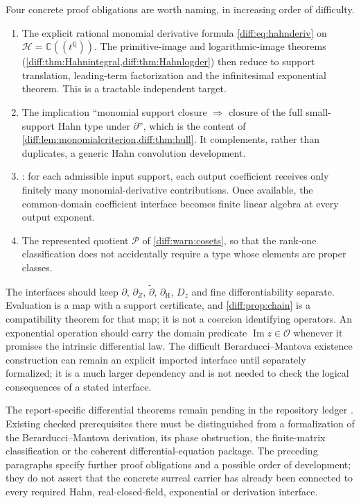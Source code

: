 \documentclass[11pt,letterpaper]{article}
\numberwithin{equation}{section}
\theoremstyle{definition}
\theoremstyle{remark}
\newcommand{\C}{\mathbb C}
\newcommand{\Q}{\mathbb Q}
\newcommand{\der}{\partial}
\newcommand{\Ofin}{\mathcal O}
\newcommand{\Pcl}{\mathcal P}
\newcommand{\Imm}{\operatorname{Im}}
\newcommand{\Hring}{\mathscr H}
\newcommand{\dercoef}{\der_{\mathrm H}}
\newcommand{\dertil}{\widetilde{\der}}
\newcommand{\derZ}{\der_{Z}}
\newcommand{\Dz}{D_{z}}
\begin{document}
Four concrete proof obligations are worth naming, in increasing order of
difficulty.
\begin{enumerate}[label=(\arabic*),leftmargin=2.4em]
\item The explicit rational monomial derivative formula
\cref{diff:eq:hahnderiv} on $\Hring=\C((t^{\Q}))$. The primitive-image and
logarithmic-image theorems
(\cref{diff:thm:Hahnintegral,diff:thm:Hahnlogder}) then reduce to support
translation, leading-term factorization and the infinitesimal exponential
theorem. This is a tractable independent target.
\item The implication ``monomial support closure $\Rightarrow$ closure of the
full small-support Hahn type under $\der$'', which is the content of
\cref{diff:lem:monomialcriterion,diff:thm:hull}. It complements, rather than
duplicates, a generic Hahn convolution development.
\item {}: for each admissible input support, each
output coefficient receives only finitely many monomial-derivative
contributions. Once available, the common-domain coefficient interface becomes
finite linear algebra at every output exponent.
\item The represented quotient $\Pcl$ of \cref{diff:warn:cosets}, so that the
rank-one classification does not accidentally require a type whose elements
are proper classes.
\end{enumerate}
The interfaces should keep $\der$, $\derZ$, $\dertil$, $\dercoef$, $\Dz$ and
fine differentiability separate. Evaluation is a map with a support
certificate, and \cref{diff:prop:chain} is a compatibility theorem for that
map; it is not a coercion identifying operators. An exponential operation
should carry the domain predicate $\Imm z\in\Ofin$ whenever it promises the
intrinsic differential law. The difficult Berarducci--Mantova existence
construction can remain an explicit imported interface until separately
formalized; it is a much larger dependency and is not needed to check the
logical consequences of a stated interface.

\begin{warning}
\label{diff:warn:noformalization}
The report-specific differential theorems remain pending in the repository
ledger . Existing checked prerequisites there
must be distinguished from a formalization of the Berarducci--Mantova
derivation, its phase obstruction, the finite-matrix classification or the
coherent differential-equation package. The preceding paragraphs specify
further proof obligations and a possible order of development; they do not
assert that the concrete surreal carrier has already been connected to every
required Hahn, real-closed-field, exponential or derivation interface.
\end{warning}
\end{document}
